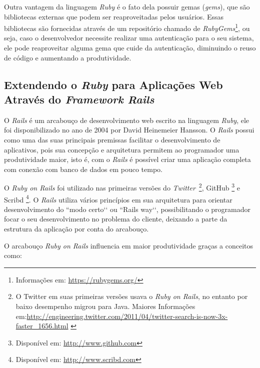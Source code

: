 Outra vantagem da linguagem \textit{Ruby} é o fato dela possuir gemas (\textit{gems}), que são bibliotecas externas que podem ser reaproveitadas pelos usuários. Essas bibliotecas são fornecidas através de um repositório chamado de \textit{RubyGems}\footnote{Informações em: \url{https://rubygems.org/}}, ou seja, caso o desenvolvedor necessite realizar uma autenticação para o seu sistema, ele pode reaproveitar alguma gema que cuide da autenticação, diminuindo o reuso de código e aumentando a produtividade.

\subsection{Extendendo o \textit{Ruby} para Aplicações Web Através do \textit{Framework Rails}}
\label{sub:frameworkrails}

O \textit{Rails} é um arcabouço de desenvolvimento web escrito na linguagem \textit{Ruby}, ele foi disponibilizado no ano de 2004 por David Heinemeier Hansson. O \textit{Rails} possui como uma das suas principais premissas facilitar o desenvolvimento de aplicativos, pois sua concepção e arquitetura permitem ao programador uma produtividade maior, isto é, com o \textit{Rails} é possível criar uma aplicação completa com conexão com banco de dados em pouco tempo. 

O \textit{Ruby on Rails} foi utilizado nas primeiras versões do \textit{Twitter}~\footnote{O Twitter em suas primeiras versões usava o \textit{Ruby on Rails}, no entanto por baixo desempenho migrou para Java. Maiores Informações em:\url{http://engineering.twitter.com/2011/04/twitter-search-is-now-3x-faster_1656.html} \label{ft:twitterjava}}, GitHub \footnote{Disponível em: \url{http://www.github.com}} e Scribd \footnote{Disponível em: \url{http://www.scribd.com}}. O \textit{Rails} utiliza vários princípios em sua arquitetura para orientar desenvolvimento do ``modo certo‘‘ ou ``Rails way‘‘, possibilitando o programador focar o seu desenvolvimento no problema do cliente, deixando a parte da estrutura da aplicação por conta do arcabouço. \cite{meneses2014mezuro}

O arcabouço \textit{Ruby on Rails} influencia em maior produtividade graças a conceitos como:


